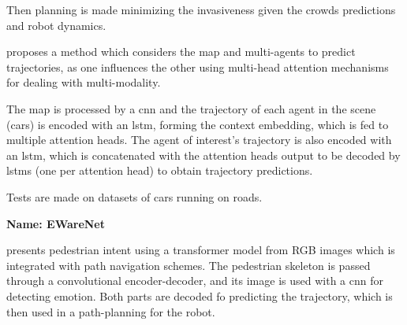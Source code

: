 Then planning is made minimizing the invasiveness given the crowds predictions and robot dynamics.  



\cite{messaoud2021trajectory} proposes a method which considers the map and multi-agents to predict trajectories, as one influences the other using multi-head attention mechanisms for dealing with multi-modality.

The map is processed by a \gls{cnn} and the trajectory of each agent in the scene (cars) is encoded with an \gls{lstm}, forming the context embedding, which is fed to multiple attention heads.
%
The agent of interest's trajectory is also encoded with an \gls{lstm}, which is concatenated with the attention heads output to be decoded by \glspl{lstm} (one per attention head) to obtain trajectory predictions.

Tests are made on datasets of cars running on roads.


\textbf{Name: EWareNet}

\cite{narayanan2023ewarenet} presents pedestrian intent using a transformer model from RGB images which is integrated with path navigation schemes.
%
The pedestrian skeleton is passed through a convolutional encoder-decoder, and its image is used with a \gls{cnn} for detecting emotion. 
%
Both parts are decoded fo predicting the trajectory, which is then used in a path-planning for the robot.

